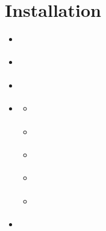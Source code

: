 \documentclass[a4paper,10pt,english,openany]{sphinxmanual}
\begin{document}
\section{Installation}
\label{\detokenize{installation:installation}}\label{\detokenize{installation::doc}}
\begin{sphinxShadowBox}
\begin{itemize}
\item {} 
\label{\detokenize{installation:id1}}{\hyperref[\detokenize{installation:dependencies}]{}}

\item {} 
\label{\detokenize{installation:id2}}{\hyperref[\detokenize{installation:quick-installation}]{}}

\item {} 
\label{\detokenize{installation:id3}}{\hyperref[\detokenize{installation:source-installation}]{}}

\item {} 
\label{\detokenize{installation:id4}}{\hyperref[\detokenize{installation:parallel-installation-for-future-version}]{}}
\begin{itemize}
\item {} 
\label{\detokenize{installation:id5}}{\hyperref[\detokenize{installation:install-pyfk}]{}}

\item {} 
\label{\detokenize{installation:id6}}{\hyperref[\detokenize{installation:install-the-hdf5-parallel-version}]{}}

\item {} 
\label{\detokenize{installation:id7}}{\hyperref[\detokenize{installation:install-the-h5py-parallel-version}]{}}

\item {} 
\label{\detokenize{installation:id8}}{\hyperref[\detokenize{installation:install-pyasdf-parallel-version}]{}}

\item {} 
\label{\detokenize{installation:id9}}{\hyperref[\detokenize{installation:install-mcmtpy-parallel-version}]{}}

\end{itemize}

\item {} 
\label{\detokenize{installation:id10}}{\hyperref[\detokenize{installation:reference-installation-blog}]{}}

\end{itemize}
\end{sphinxShadowBox}
\end{document}
